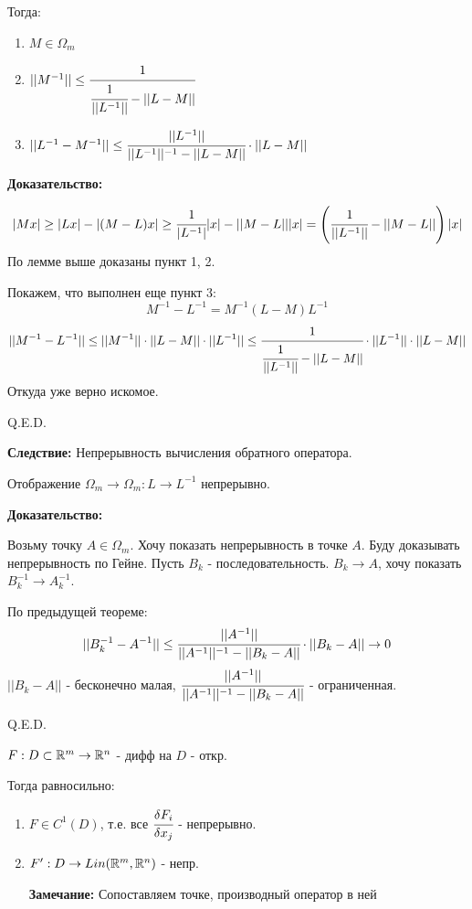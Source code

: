 Тогда:
\begin{enumerate}
    \item $M \in  \Omega_m$
    \item $||M^{-1}|| \leq \cfrac{1}{\cfrac{1}{||L^{-1}||}-||L-M||}$
    \item $||L^{-1}- M^{-1}||\leq \cfrac{||L^{-1}||}{||L^{-1}||^{-1}- ||L-M||}\cdot ||L-M||$
\end{enumerate}
\textbf{Доказательство:}

$$|Mx|\geq |Lx|- |(M-L)x|\geq \cfrac{1}{|L^{-1}|}|x|  - ||M-L|| |x| = \left( \cfrac{1}{||L^{-1}||}- ||M-L||\right)|x|$$
По лемме выше доказаны пункт 1, 2.

Покажем, что выполнен еще пункт 3:
$$M^{-1}-L^{-1}=M^{-1}(L-M)L^{-1}$$
$$||M^{-1}-L^{-1}||\leq ||M^{-1}|| \cdot ||L-M|| \cdot||L^{-1}||\leq \cfrac{1}{\cfrac{1}{||L^{-1}||}-||L-M||}\cdot ||L^{-1}||\cdot ||L-M||$$
Откуда уже верно искомое.


\hfill Q.E.D.

\textbf{Следствие:}  Непрерывность вычисления обратного оператора.

Отображение $\Omega_m\rightarrow \Omega_m:L \rightarrow L^{-1}$ непрерывно. 

\textbf{Доказательство:}

Возьму точку $A\in \Omega_m$. Хочу показать непрерывность в точке $A$. Буду доказывать непрерывность по Гейне. Пусть $B_k$ - последовательность. $B_k \rightarrow A$, хочу показать $B_k^{-1} \rightarrow A^{-1}_k$.

По предыдущей теореме: 
$$||B_k^{-1}- A^{-1}||\leq  \cfrac{||A^{-1}||}{||A^{-1}||^{-1}- ||B_k-A||} \cdot ||B_k-A|| \rightarrow 0$$
$||B_k-A||$ - бесконечно малая, $\cfrac{||A^{-1}||}{||A^{-1}||^{-1}- ||B_k-A||} $ - ограниченная.

\hfill Q.E.D.



$F:D \subset \mathbb{R}^m \rightarrow \mathbb{R}^n$ - дифф на $D$ - откр.

Тогда равносильно:
\begin{enumerate}
    \item $F \in C^1(D)$, т.е. все $\cfrac{\delta F_i}{\delta x_j}$ - непрерывно.
    \item $F': D \rightarrow Lin(\mathbb{R}^m, \mathbb{R}^n)$ - непр.

    \textbf{Замечание:} Сопоставляем точке, производный оператор в ней
\end{enumerate}

